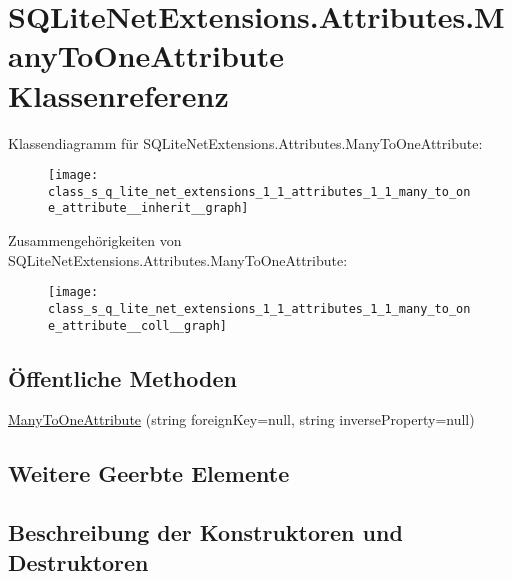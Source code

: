 \hypertarget{class_s_q_lite_net_extensions_1_1_attributes_1_1_many_to_one_attribute}{}\section{S\+Q\+Lite\+Net\+Extensions.\+Attributes.\+Many\+To\+One\+Attribute Klassenreferenz}
\label{class_s_q_lite_net_extensions_1_1_attributes_1_1_many_to_one_attribute}


Klassendiagramm für S\+Q\+Lite\+Net\+Extensions.\+Attributes.\+Many\+To\+One\+Attribute\+:\nopagebreak
\begin{figure}[H]
\begin{center}
\leavevmode
\texttt{[image: class\_s\_q\_lite\_net\_extensions\_1\_1\_attributes\_1\_1\_many\_to\_one\_attribute\_\_inherit\_\_graph]}
\end{center}
\end{figure}


Zusammengehörigkeiten von S\+Q\+Lite\+Net\+Extensions.\+Attributes.\+Many\+To\+One\+Attribute\+:\nopagebreak
\begin{figure}[H]
\begin{center}
\leavevmode
\texttt{[image: class\_s\_q\_lite\_net\_extensions\_1\_1\_attributes\_1\_1\_many\_to\_one\_attribute\_\_coll\_\_graph]}
\end{center}
\end{figure}
\subsection*{Öffentliche Methoden}
\begin{DoxyCompactItemize}
\item 
\mbox{\hyperlink{class_s_q_lite_net_extensions_1_1_attributes_1_1_many_to_one_attribute_a1bb2ee7cb041bcccaebb2c001864d4a1}{Many\+To\+One\+Attribute}} (string foreign\+Key=null, string inverse\+Property=null)
\end{DoxyCompactItemize}
\subsection*{Weitere Geerbte Elemente}


\subsection{Beschreibung der Konstruktoren und Destruktoren}
\mbox{\label{class_s_q_lite_net_extensions_1_1_attributes_1_1_many_to_one_attribute_a1bb2ee7cb041bcccaebb2c001864d4a1}} 
